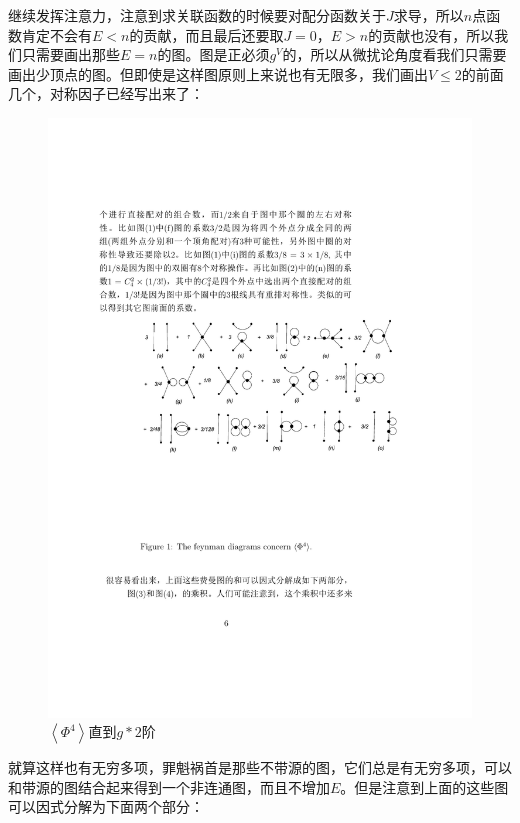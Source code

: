 继续发挥注意力，注意到求关联函数的时候要对配分函数关于$J$求导，所以$n$点函数肯定不会有$E<n$的贡献，而且最后还要取$J=0$，$E>n$的贡献也没有，所以我们只需要画出那些$E=n$的图。图是正必须$g^V$的，所以从微扰论角度看我们只需要画出少顶点的图。但即使是这样图原则上来说也有无限多，我们画出$V\leq 2$的前面几个，对称因子已经写出来了：
\begin{figure}[H]
	\centering
	\includegraphics{figs/fig3.pdf}
	\caption{$\left<{\Phi^4}\right>$直到$g*2$阶}
\end{figure}
就算这样也有无穷多项，罪魁祸首是那些不带源的图，它们总是有无穷多项，可以和带源的图结合起来得到一个非连通图，而且不增加$E$。但是注意到上面的这些图可以因式分解为下面两个部分：
